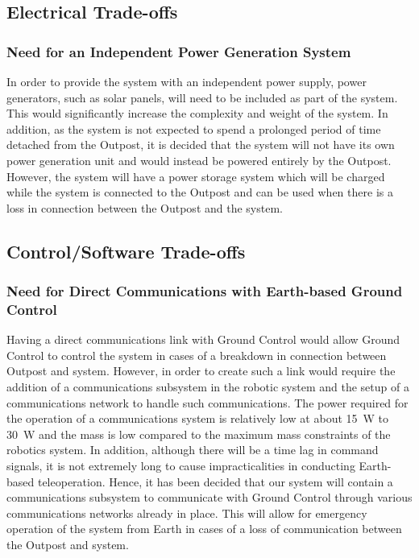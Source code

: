 \documentclass[12pt, letterpaper]{article}
\begin{document}
\subsection{Electrical Trade-offs}
\subsubsection{Need for an Independent Power Generation System}
In order to provide the system with an independent power supply, power generators, such as solar panels, will need to be included as part of the system. This would significantly increase the complexity and weight of the system. In addition, as the system is not expected to spend a prolonged period of time detached from the Outpost, it is decided that the system will not have its own power generation unit and would instead be powered entirely by the Outpost. However, the system will have a power storage system which will be charged while the system is connected to the Outpost and can be used when there is a loss in connection between the Outpost and the system.

\subsection{Control/Software Trade-offs}
\subsubsection{Need for Direct Communications with Earth-based Ground Control}
Having a direct communications link with Ground Control would allow Ground Control to control the system in cases of a breakdown in connection between Outpost and system. However, in order to create such a link would require the addition of a communications subsystem in the robotic system and the setup of a communications network to handle such communications. The power required for the operation of a communications system is relatively low at about \SI{15}{\watt} to \SI{30}{\watt}\cite{Marscomm} and the mass is low compared to the maximum mass constraints of the robotics system. In addition, although there will be a time lag in command signals, it is not extremely long to cause impracticalities in conducting Earth-based teleoperation\cite{roboserve}. Hence, it has been decided that our system will contain a communications subsystem to communicate with Ground Control through various communications networks already in place. This will allow for emergency operation of the system from Earth in cases of a loss of communication between the Outpost and system.
\end{document}
